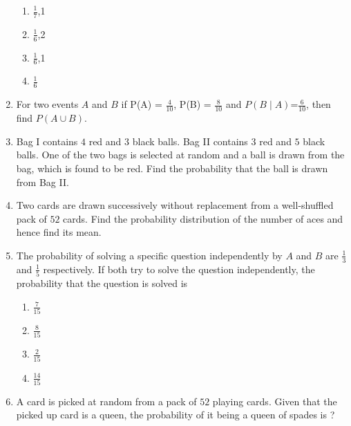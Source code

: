 \documentclass{article}
\theoremstyle{remark}
\begin{document}
\begin{enumerate}[label=\arabic*.,ref=\theenumi]
 \begin{enumerate}[label=(\alph*)]
    
 \item  $\frac{1}{7}$,1 
 
 \item  $\frac{1}{6}$,2

 \item  $\frac{1}{6}$,1

 \item  $\frac{1}{6}$

\end{enumerate}


\item For two events $A$ and $B$ if P(A) = $\frac{4}{10}$, P(B) = $\frac{8}{10}$ and 
$ P(B \mid A)$=$\frac{6}{10}$, then find $ P(A \cup B)$.

\item Bag I contains $4$ red and $3$ black balls. Bag II contains $3$ red 
and $5$ black balls. One of the two bags is selected at random 
and a ball is drawn from the bag, which is found to be red. 
Find the probability that the ball is drawn from Bag II.

\item Two cards are drawn successively without replacement from a 
well-shuffled pack of $52$ cards. Find the probability 
distribution of the number of aces and hence find its mean.
\newpage

\item The probability of solving a specific question independently by $A$ and $B$ 
are $\frac{1}{3}$ and $\frac{1}{5}$ respectively. If both try to solve the question independently, 
the probability that the question is solved is 

\begin{enumerate}[label=(\alph*)]
    
 \item  $\frac{7}{15}$
 
 \item  $\frac{8}{15}$
 
 \item  $\frac{2}{15}$
 
 \item  $\frac{14}{15}$

\end{enumerate}

\item A card is picked at random from a pack of $52$ playing cards. Given that 
the picked up card is a queen, the probability of it being a queen of 
spades is ?


\end{enumerate}
\end{document}
